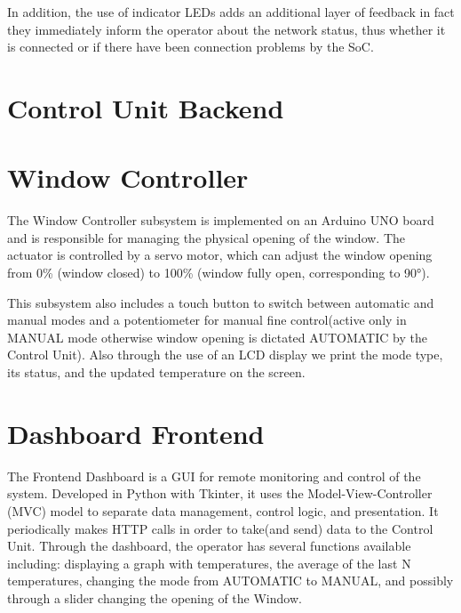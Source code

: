 \documentclass[a4paper]{article}
\begin{document}
	In addition, the use of indicator LEDs adds an additional layer of feedback in fact they immediately inform the operator about the network status, thus whether it is connected or if there have been connection problems by the SoC.

	\section{Control Unit Backend}
	
	\section{Window Controller}
	The Window Controller subsystem is implemented on an Arduino UNO board and is responsible for managing the physical opening of the window. The actuator is controlled by a servo motor, which can adjust the window opening from 0\% (window closed) to 100\% (window fully open, corresponding to 90°).
	
	This subsystem also includes a touch button to switch between automatic and manual modes and a potentiometer for manual fine control(active only in MANUAL mode otherwise window opening is dictated AUTOMATIC by the Control Unit). Also through the use of an LCD display we print the mode type, its status, and the updated temperature on the screen.
	
	\section{Dashboard Frontend}
	The Frontend Dashboard is a GUI for remote monitoring and control of the system. Developed in Python with Tkinter, it uses the Model-View-Controller (MVC) model to separate data management, control logic, and presentation. It periodically makes HTTP calls in order to take(and send) data to the Control Unit. Through the dashboard, the operator has several functions available including: displaying a graph with temperatures, the average of the last N temperatures, changing the mode from AUTOMATIC to MANUAL, and possibly through a slider changing the opening of the Window.
	
	
\end{document}
